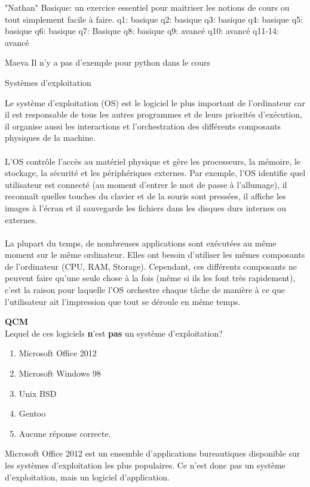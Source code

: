 \begin{note}{"Nathan"}
Basique: un exercice essentiel pour maitriser les notions de cours ou tout simplement facile à faire.
    q1: basique
    q2: basique 
    q3: basique
    q4: basique
    q5: basique
    q6: basique
    q7: Basique
    q8: basique
    q9: avancé
    q10: avancé
    q11-14: avancé
\end{note}
\begin{note}{Maeva}
    Il n'y a pas d'exemple pour python dans le cours
\end{note}
\begin{section}{Systèmes d'exploitation}
    
Le système d'exploitation (OS) est le logiciel le plus important de l'ordinateur car il est responsable de tous les autres programmes et de leurs priorités d'exécution, il organise aussi les interactions et l'orchestration des différents composants physiques de la machine.
\\\\
L'OS contrôle l'accès au matériel physique et gère les processeurs, la mémoire, le stockage, la sécurité et les périphériques externes. Par exemple, l'OS identifie quel utilisateur est connecté (au moment d'entrer le mot de passe à l'allumage), il reconnaît quelles touches du clavier et de la souris sont pressées, il affiche les images à l'écran et il sauvegarde les fichiers dans les disques durs internes ou externes.
\\\\
La plupart du temps, de nombreuses applications sont exécutées au même moment sur le même ordinateur. Elles ont besoin d'utiliser les mêmes composants de l'ordinateur (CPU, RAM, Storage). Cependant, ces différents composants ne peuvent faire qu'une seule chose à la fois (même si ils les font très rapidement), c'est la raison pour laquelle l'OS orchestre chaque tâche de manière à ce que l'utilisateur ait l'impression que tout se déroule en même temps.
\\

    \begin{Exercice}[3 minutes]  \textbf{QCM}\\
    Lequel de ces logiciels \textbf{n}'est \textbf{pas} un système d'exploitation?
        \begin{enumerate}
            \item Microsoft Office 2012
            \item Microsoft Windows 98
            \item Unix BSD
            \item Gentoo
            \item Aucune réponse correcte.
        \end{enumerate}
    \end{Exercice}
    \begin{solution}
                Microsoft Office 2012 est un ensemble d'applications bureautiques disponible sur les systèmes d'exploitation les plus populaires.
		Ce n'est donc pas un système d'exploitation, mais un logiciel d'application. 
    \end{solution}


\end{section}
